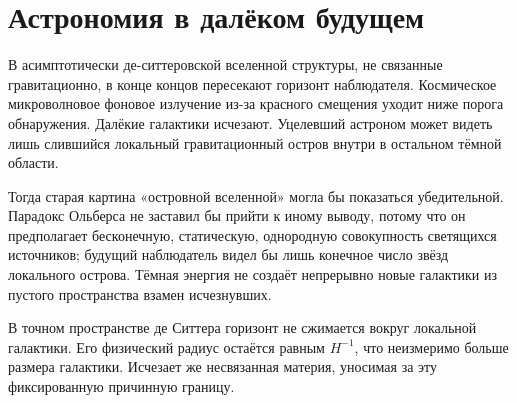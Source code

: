 \section{Астрономия в далёком будущем}

В асимптотически де-ситтеровской вселенной структуры, не связанные гравитационно, в конце концов пересекают горизонт наблюдателя. Космическое микроволновое фоновое излучение из-за красного смещения уходит ниже порога обнаружения. Далёкие галактики исчезают. Уцелевший астроном может видеть лишь слившийся локальный гравитационный остров внутри в остальном тёмной области.

\begin{classroomqa}
\end{classroomqa}

Тогда старая картина «островной вселенной» могла бы показаться убедительной. Парадокс Ольберса не заставил бы прийти к иному выводу, потому что он предполагает бесконечную, статическую, однородную совокупность светящихся источников; будущий наблюдатель видел бы лишь конечное число звёзд локального острова. Тёмная энергия не создаёт непрерывно новые галактики из пустого пространства взамен исчезнувших.

В точном пространстве де Ситтера горизонт не сжимается вокруг локальной галактики. Его физический радиус остаётся равным \(H^{-1}\), что неизмеримо больше размера галактики. Исчезает же несвязанная материя, уносимая за эту фиксированную причинную границу.

\begin{classroomqa}
\end{classroomqa}

\begin{classroomqa}
\end{classroomqa}

